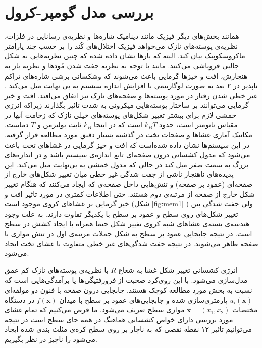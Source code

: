 \section{
بررسی مدل گومپر-کرول
}
همانند بخش‌های دیگر فیزیک مانند دینامیک شاره‌ها و نظریه‌ی رسانایی در فلزات، نظریه‌ی پوسته‌های نازک می‌خواهد فیزیک اختلال‌های کُند را بر حسب چند پارامتر ماکروسکوپیک بیان کند. البته که بارها نشان داده شده که چنین نظریه‌هایی به شکل‌ جالبی فروپاشی می‌کنند. مانند با توجه به نظریه جفت شدن مُود‌ها و نظریه باز به هنجارش، افت و خیز‌ها گرمایی باعث می‌شوند که وشکسانی برشی
شاره‌های تراکم ناپذیر در ۲ بعد به صورت لوگاریتمی با افزایش اندازه سیستم به بی نهایت میل می‌کند 
\cite{gomppernelson2012}
. غیر خطی شدن رفتار در مورد پوسته‌ها و صفحه‌های نازک نیز اتفاق می‌افتد. افت و خیز گرمایی می‌توانند بر ساختار پوسته‌هایی میکرونی به شدت تاثیر بگذارند زیراکه انرژی خمشی لازم برای بیشتر تغییر شکل‌های پوسته‌های خیلی نازک که زخامت آنها در مقیاس نانومتر است، حدود $k_BT$ است که در اینجا $k_B$ ثابت بولتزمن و
$T$
دماست. مکانیک آماری غشاها و صفحات تخت در گذشته بسیار دقبق مورد مطالعه قرار گرفته. در این سیستم‌ها نشان داده شده‌است که افت و خیز گرمایی در غشاهای تخت باعث می‌شود که مدول کشسانی درون صفحه‌ای
 تابع اندازه‌‌ی سیستم باشد و در اندازه‌های بزرگ به سمت صفر میل کند در حالی که مدول خمشی به بی‌نهایت میل می‌کند. این پدیده‌های ناهنجار ناشی از جفت شدگی غیر خطی میان تغییر شکل‌های خارج از صفحه‌ای (عمود بر صفحه) و تنش‌هایی داخل صفحه‌ی که ایجاد می‌کنند که هنگام تغییر شکل خارج از صفحه از مرتبه‌ی دوم هستند. حتی اطلاعات کمتری در مورد تاثیر افت و خیز گرمایی بر غشا‌های کروی موجود است (شکل 
 \ref{fig:mem1}
)
ولی جفت شدگی بین تغییر شکل‌های روی سطح و عمود بر سطح با یکدیگر تفاوت دارند. به علت وجود هندسه‌ی بسته‌ی غشاهای شبه کروی تغییر شکل حتما همراه با ایجاد کشش در سطح است. در نتیجه جابجایی عمود بر سطح به شکل جملات مرتبه‌ی اول در تنش موازی با صفحه ظاهر می‌شوند. در نتیجه جفت‌ شدگی‌های غیر خطی متفاوت با غشای تخت ایجاد می‌‌شود.

انرژی کشسانی تغییر شکل غشا به شعاع
 $R$ 
با نظریه‌ی پوسته‌های نازک کم عمق مدل‌سازی می‌شود. با این روی‌کرد صحبت از فرورفتیگی‌ها یا برآمدگی‌هایی است که نسبت به بخش مورد مطالعه کوچک هستند. جابجایی درون صفحه با فنون دو مولفه‌ای 
$u_i(\boldsymbol{x})$ 
پارمتری‌سازی شده و جابجایی‌های عمود بر سطح با میدان 
$f(\boldsymbol{x})$
در دستگاه مختصات
$\boldsymbol{x}=(x_1,x_2)$
موازی سطح تعریف می‌‌شود. ما فرض می‌کنیم که تمام غشای مورد بررسی دارای خواص کشسانی هماهنگ در همه جای سطح است در نتیجه می‌توانیم تاثیر ۱۲ نقطه نقصی که به ناچار بر روی سطح کره‌ی مثلث بندی شده ایجاد می‌شود را ناچیز در نظر بگیریم.
















